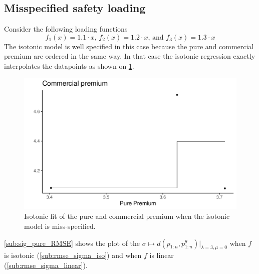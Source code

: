 \documentclass[10pt]{article}
\begin{document}
\subsection{Misspecified safety loading} \label{ssec:miss_specfifed_safety_loading}
Consider the following loading functions
$$
f_1(x) = 1.1\cdot x\text{, }f_2(x) = 1.2\cdot x \text{, and } f_3(x) = 1.3\cdot x
$$
The isotonic model is well specified in this case because the pure and commercial premium are ordered in the same way. In that case the isotonic regression exactly interpolates the datapoints as shown on \cref{fig:pp_cp_miss_specified}.

\begin{figure}[!ht]
  \begin{center}
  \includegraphics[width=0.7\linewidth]{../figures/pp_cp_miss_specified}
    \caption{Isotonic fit of the pure and commercial premium when the isotonic model is miss-specified.}
    \label{fig:pp_cp_miss_specified}
  \end{center}
\end{figure}

\cref{sub:sig_pure_RMSE} shows the plot of the $\sigma\mapsto d\left(p_{1:n},p_{1:n}^{\theta}\right)\Big\rvert_{\lambda =3, \mu =0}$ when $f$ is isotonic (\cref{sub:rmse_sigma_iso}) and when $f$ is linear (\cref{sub:rmse_sigma_linear}).
\end{document}
